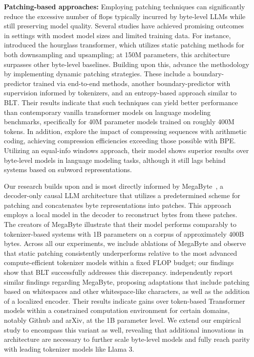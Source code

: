 \textbf{Patching-based approaches:} Employing patching techniques can significantly reduce the excessive number of flops typically incurred by byte-level LLMs while still preserving model quality. Several studies have achieved promising outcomes in settings with modest model sizes and limited training data. For instance, \cite{nawrot-etal-2022-hierarchical} introduced the hourglass transformer, which utilizes static patching methods for both downsampling and upsampling; at 150M parameters, this architecture surpasses other byte-level baselines. Building upon this, \cite{nawrot-etal-2023-efficient} advance the methodology by implementing dynamic patching strategies. These include a boundary-predictor trained via end-to-end methods, another boundary-predictor with supervision informed by tokenizers, and an entropy-based approach similar to {\textsc BLT}. Their results indicate that such techniques can yield better performance than contemporary vanilla transformer models on language modeling benchmarks, specifically for 40M parameter models trained on roughly 400M tokens. In addition, \cite{lester2024training} explore the impact of compressing sequences with arithmetic coding, achieving compression efficiencies exceeding those possible with BPE. Utilizing an equal-info windows approach, their model shows superior results over byte-level models in language modeling tasks, although it still lags behind systems based on subword representations.

Our research builds upon and is most directly informed by MegaByte~\citep{yu2023megabyte}, a decoder-only causal LLM architecture that utilizes a predetermined scheme for patching and concatenates byte representations into patches. This approach employs a local model in the decoder to reconstruct bytes from these patches. The creators of MegaByte illustrate that their model performs comparably to tokenizer-based systems with 1B parameters on a corpus of approximately 400B bytes. Across all our experiments, we include ablations of MegaByte and observe that static patching consistently underperforms relative to the most advanced compute-efficient tokenizer models within a fixed FLOP budget; our findings show that {\textsc BLT} successfully addresses this discrepancy. \cite{slagle2024spacebyte} independently report similar findings regarding MegaByte, proposing adaptations that include patching based on whitespaces and other whitespace-like characters, as well as the addition of a localized encoder. Their results indicate gains over token-based Transformer models within a constrained computation environment for certain domains, notably Github and arXiv, at the 1B parameter level. We extend our empirical study to encompass this variant as well, revealing that additional innovations in architecture are necessary to further scale byte-level models and fully reach parity with leading tokenizer models like Llama 3.

